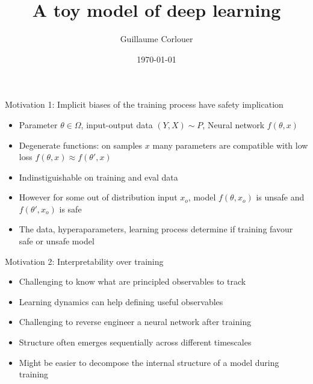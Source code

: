 \documentclass[aspectratio=169,11pt]{beamer}
\title[]{A toy model of deep learning}
\author[Corlouer]{Guillaume Corlouer}
\date{\today}
\begin{document}
\maketitle
\begin{frame}{Motivation 1: Implicit biases of the training process have safety implication}
\begin{itemize}
    \item Parameter $\theta\in \Omega$, input-output data $(Y,X)\sim P$, Neural network $f(\theta, x)$
    \item Degenerate functions: on samples $x$ many parameters are compatible with low loss $f(\theta,x)\approx f(\theta',x)$ 
    \item Indinstiguishable on training and eval data
    \item However for some out of distribution input $x_o$, model $f(\theta,x_o)$ is unsafe and $f(\theta',x_o)$ is safe
    \item The data, hyperaparameters, learning process determine if training favour safe or unsafe model
\end{itemize}

\end{frame}

\begin{frame}{Motivation 2: Interpretability over training}
\begin{itemize}
    \item Challenging to know what are principled observables to track
    \item Learning dynamics can help defining useful observables
    \item Challenging to reverse engineer a neural network after training
    \item Structure often emerges sequentially across different timescales
    \item Might be easier to decompose the internal structure of a model during training 
\end{itemize}

\end{frame}
\end{document}
